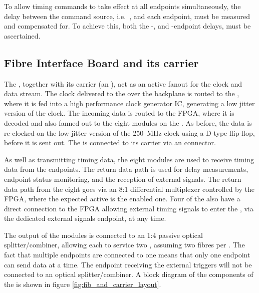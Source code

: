 \documentclass[main.tex]{subfiles}
\begin{document}
To allow timing commands to take effect at all endpoints simultaneously, the delay between the command source, i.e.\ , and each endpoint, must be measured and compensated for. To achieve this, both the -, and -endpoint delays, must be ascertained.

\subsection{Fibre Interface Board and its carrier}
The , together with its carrier (an ), act as an active fanout for the  clock and data stream. The clock delivered to the  over the  backplane is routed to the , where it is fed into a high performance clock generator IC, generating a low jitter version of the clock. The incoming data is routed to the  FPGA, where it is decoded and also fanned out to the eight  modules on the . As before, the  data is re-clocked on the low jitter version of the \SI{250}{\MHz} clock using a D-type flip-flop, before it is sent out. The  is connected to its  carrier via an  connector.

As well as transmitting timing data, the eight  modules are used to receive timing data from the endpoints. The return data path is used for delay measurements, endpoint status monitoring, and the reception of external signals. The return data path from the eight  goes via an 8:1 differential multiplexer controlled by the  FPGA, where the expected active  is the enabled one. Four of the  also have a direct connection to the  FPGA allowing external timing signals to enter the , via the dedicated external signals endpoint, at any time.

The output of the  modules is connected to an 1:4 passive optical splitter/combiner, allowing each  to service two , assuming two fibres per . The fact that multiple endpoints are connected to one  means that only one endpoint can send  data at a time. The endpoint receiving the external triggers will not be connected to an optical splitter/combiner. A block diagram of the components of the  is shown in figure \ref{fig:fib_and_carrier_layout}.
\end{document}
